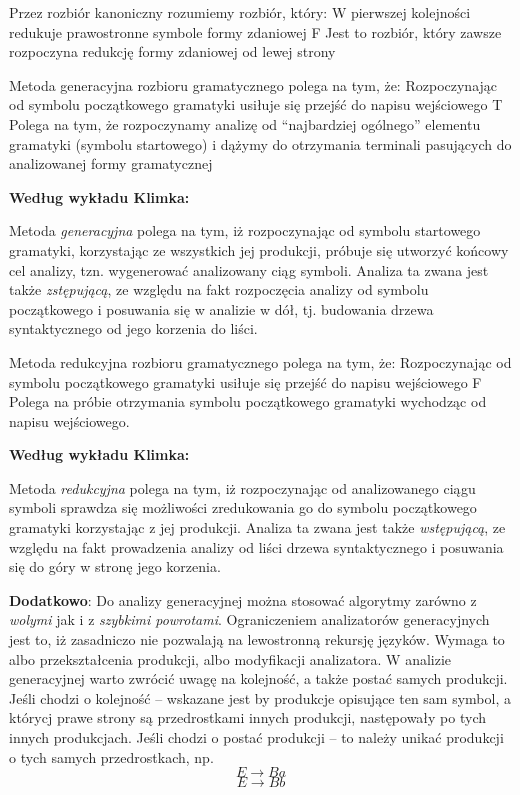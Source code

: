 \answer
{Przez rozbiór kanoniczny rozumiemy rozbiór, który:}
{W pierwszej kolejności redukuje prawostronne symbole formy zdaniowej}
{F}
{Jest to rozbiór, który zawsze rozpoczyna redukcję formy zdaniowej od lewej strony}
{}

\answer
{Metoda generacyjna rozbioru gramatycznego polega na tym, że:}
{Rozpoczynając od symbolu początkowego gramatyki usiłuje się przejść do napisu wejściowego}
{T}
{Polega na tym, że rozpoczynamy analizę od ``najbardziej ogólnego'' elementu gramatyki (symbolu startowego) i dążymy do otrzymania terminali pasujących do analizowanej formy gramatycznej}
{\textbf{Według wykładu Klimka:}

Metoda \textit{generacyjna} polega na tym, iż rozpoczynając od symbolu startowego gramatyki, korzystając ze wszystkich jej produkcji, próbuje się utworzyć końcowy cel analizy, tzn. wygenerować analizowany ciąg symboli. Analiza ta zwana jest także \textit{zstępującą}, ze względu na fakt rozpoczęcia analizy od symbolu początkowego i posuwania się w analizie w dół, tj. budowania drzewa syntaktycznego od jego korzenia do liści.}

\answer
{Metoda redukcyjna rozbioru gramatycznego polega na tym, że:}
{Rozpoczynając od symbolu początkowego gramatyki usiłuje się przejść do napisu wejściowego}
{F}
{Polega na próbie otrzymania symbolu początkowego gramatyki wychodząc od napisu wejściowego.}
{\textbf{Według wykładu Klimka:}

Metoda \textit{redukcyjna} polega na tym, iż rozpoczynając od analizowanego ciągu symboli sprawdza się możliwości zredukowania go do symbolu początkowego gramatyki korzystając z jej produkcji. Analiza ta zwana jest także \textit{wstępującą}, ze względu na fakt prowadzenia analizy od liści drzewa syntaktycznego i posuwania się do góry w stronę jego korzenia.

\textbf{Dodatkowo}: Do analizy generacyjnej można stosować algorytmy zarówno z \textit{wolymi} jak i z \textit{szybkimi powrotami}. Ograniczeniem analizatorów generacyjnych jest to, iż zasadniczo nie pozwalają na lewostronną rekursję języków. Wymaga to albo przekształcenia produkcji, albo modyfikacji analizatora. W analizie generacyjnej warto zwrócić uwagę na kolejność, a także postać samych produkcji. Jeśli chodzi o kolejność -- wskazane jest by produkcje opisujące ten sam symbol, a którycj prawe strony są przedrostkami innych produkcji, następowały po tych innych produkcjach. Jeśli chodzi o postać produkcji -- to należy unikać produkcji o tych samych przedrostkach, np.
$$ E \rightarrow Ba $$
$$ E \rightarrow Bb $$
}

